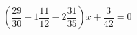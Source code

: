 \begin{ex}[type=equation]
	\begin{condition}
		$\left(\dfrac{29}{30} +1\dfrac{11}{12}-2\dfrac{31}{35}\right) x + \dfrac{3}{42} =0$
	\end{condition}
\end{ex}